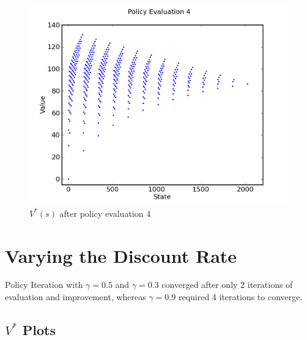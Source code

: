 \documentclass[a4paper]{article}
\begin{document}
\begin{figure}[h]
\center
\includegraphics[scale=0.8]{policy_iteration/evaluation_4.png}
\caption{$V^*(s)$ after policy evaluation 4}
\end{figure}


\clearpage

\section{Varying the Discount Rate}

Policy Iteration with $\gamma = 0.5$ and $\gamma = 0.3$ converged after only 2 iterations of evaluation and improvement, whereas $\gamma = 0.9$ required 4 iterations to converge.

\subsection{$V^*$ Plots}

\end{document}
